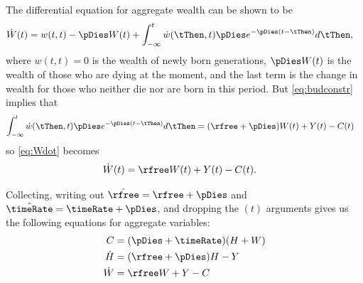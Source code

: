\documentclass{handout}
\begin{document}
\begin{enumerate}
The differential equation for aggregate wealth can be 
shown to be
\begin{equation}\begin{gathered}\begin{aligned}
        \dot{W}(t) & =  w(t,t) - \pDies W(t) + \int_{-\infty}^{t} \dot{w}(\tThen,t) \pDies e^{-\pDies(t-\tThen)} d\tThen, \label{eq:Wdot}
\end{aligned}\end{gathered}\end{equation}
where $w(t,t)=0$ is the wealth of newly born generations, $\pDies W(t)$ is 
the wealth of those who are dying at the moment, and the last term is 
the change in wealth for those who neither die nor are born in this 
period.  But \eqref{eq:budconstr} implies that
\begin{equation}\begin{gathered}\begin{aligned}
  \int_{-\infty}^{t} \dot{w}(\tThen,t) \pDies e^{-\pDies(t-\tThen)} d\tThen & =  (\rfree+\pDies) W(t) + Y(t)-C(t)
\end{aligned}\end{gathered}\end{equation}
so \eqref{eq:Wdot} becomes
\begin{equation}\begin{gathered}\begin{aligned}
        \dot{W}(t) & =  \rfree W(t) + Y(t)-C(t).
\end{aligned}\end{gathered}\end{equation}

Collecting, writing out $\hat{\rfree}=\rfree+\pDies$ and $\hat{\timeRate}=\timeRate+\pDies$, and 
dropping the $(t)$ arguments gives us the following equations for 
aggregate variables:
\begin{equation}\begin{gathered}\begin{aligned}
        C & =  (\pDies+\timeRate) (H+W) \label{eq:clevel} \\
        \dot{H} & =  (\rfree+\pDies) H - Y  \\ 
        \dot{W} & =  \rfree W + Y - C %
\end{aligned}\end{gathered}\end{equation}




\end{enumerate}


{

\pagebreak

 

}{}
\end{document}
